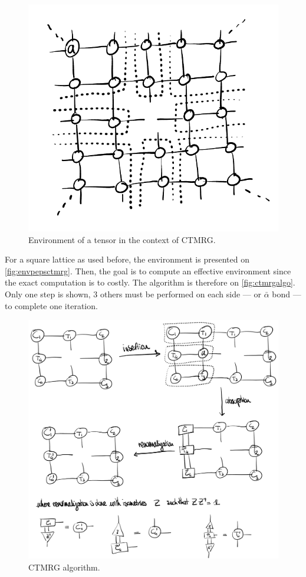         \begin{figure}[h!]
            \centering
            \includegraphics[scale=0.2]{graphs/envpepsctmrg.png}
            \caption{Environment of a tensor in the context of CTMRG.}
            \label{fig:envpepsctmrg}
        \end{figure}

        For a square lattice as used before, the environment is presented on \autoref{fig:envpepsctmrg}. Then, the goal is to compute an effective environment since the exact computation is to costly. The algorithm is therefore on \autoref{fig:ctmrgalgo}. Only one step is shown, $3$ others must be performed on each side --- or $\bar \alpha$ bond --- to complete one iteration.

        \begin{figure}[h!]
            \centering
            \includegraphics[scale=0.15]{graphs/ctmrgalgo.png}
            \caption{CTMRG algorithm.}
            \label{fig:ctmrgalgo}
        \end{figure}
    
